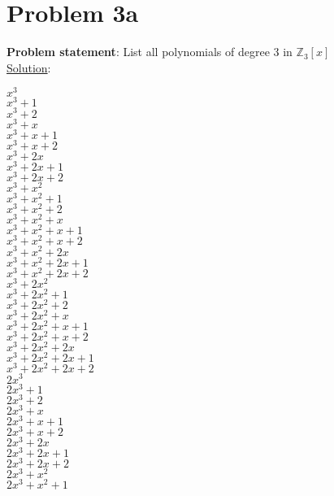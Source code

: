 \documentclass{article} %
\begin{document}
\section*{Problem 3a}
\textbf{Problem statement}: List all polynomials of degree 3 in $\mathbb{Z}_3[x]$
\\

\underline{Solution}: 
\begin{addmargin}[1em]{0em}
\begin{multicols}{2}
$x^3$
\\$x^3 + 1$
\\$x^3 + 2$
\\$x^3 + x$
\\$x^3 + x + 1$
\\$x^3 + x + 2$
\\$x^3 + 2x$
\\$x^3 + 2x + 1$
\\$x^3 + 2x + 2$
\\$x^3 + x^2$
\\$x^3 + x^2 + 1$
\\$x^3 + x^2 + 2$
\\$x^3 + x^2 + x$
\\$x^3 + x^2 + x + 1$
\\$x^3 + x^2 + x + 2$
\\$x^3 + x^2 + 2x$
\\$x^3 + x^2 + 2x + 1$
\\$x^3 + x^2 + 2x + 2$
\\$x^3 + 2x^2$
\\$x^3 + 2x^2 + 1$
\\$x^3 + 2x^2 + 2$
\\$x^3 + 2x^2 + x$
\\$x^3 + 2x^2 + x + 1$
\\$x^3 + 2x^2 + x + 2$
\\$x^3 + 2x^2 + 2x$
\\$x^3 + 2x^2 + 2x + 1$
\\$x^3 + 2x^2 + 2x + 2$
\\$2x^3$
\\$2x^3 + 1$
\\$2x^3 + 2$
\\$2x^3 + x$
\\$2x^3 + x + 1$
\\$2x^3 + x + 2$
\\$2x^3 + 2x$
\\$2x^3 + 2x + 1$
\\$2x^3 + 2x + 2$
\\$2x^3 + x^2$
\\$2x^3 + x^2 + 1$

\end{multicols}
\end{addmargin}
\end{document}
